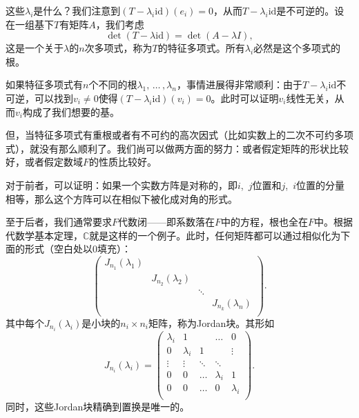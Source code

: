 这些$\lambda_i$是什么？我们注意到$(T-\lambda_i\mathrm{id})(e_i)=0$，从而$T-\lambda_i\mathrm{id}$是不可逆的。设在一组基下$T$有矩阵$A$，我们考虑
\[\det (T-\lambda\mathrm{id})=\det(A-\lambda I),\]
这是一个关于$\lambda$的$n$次多项式，称为$T$的特征多项式。所有$\lambda_i$必然是这个多项式的根。

如果特征多项式有$n$个不同的根$\lambda_1,\,\dots\,,\lambda_n$，事情进展得非常顺利：由于$T-\lambda_i\mathrm{id}$不可逆，可以找到$v_i\neq 0$使得$(T-\lambda_i\mathrm{id})(v_i)= 0$。此时可以证明$v_i$线性无关，从而$v_i$构成了我们想要的基。

但，当特征多项式有重根或者有不可约的高次因式（比如实数上的二次不可约多项式），就没有那么顺利了。我们尚可以做两方面的努力：或者假定矩阵的形状比较好，或者假定数域$F$的性质比较好。

对于前者，可以证明：如果一个实数方阵是对称的，即$i$,~$j$位置和$j$,~$i$位置的分量相等，那么这个方阵可以在相似下被化成对角的形式。

至于后者，我们通常要求$F$代数闭——即系数落在$F$中的方程，根也全在$F$中。根据代数学基本定理，$\mathbb{C}$就是这样的一个例子。此时，任何矩阵都可以通过相似化为下面的形式（空白处以$0$填充）：
\[
    \begin{pmatrix}
        J_{n_1}(\lambda_1) &                    &        &                    \\
                           & J_{n_2}(\lambda_2) &        &                    \\
                           &                    & \ddots &                    \\
                           &                    &        & J_{n_k}(\lambda_n) \\\end{pmatrix}.
\]
其中每个$J_{n_i}(\lambda_i)$是小块的$n_i\times n_i$矩阵，称为Jordan块。其形如
\[J_{n_i}(\lambda_i)=
    \begin{pmatrix}
        \lambda_i & 1         &        & \ldots    & 0         \\
        0         & \lambda_i & 1      &           & \vdots    \\
        \vdots    & \vdots    & \ddots & \ddots    &           \\
        0         & 0         & \ldots & \lambda_i & 1         \\
        0         & 0         & \ldots & 0         & \lambda_i \\\end{pmatrix}.
\]
同时，这些Jordan块精确到置换是唯一的。

